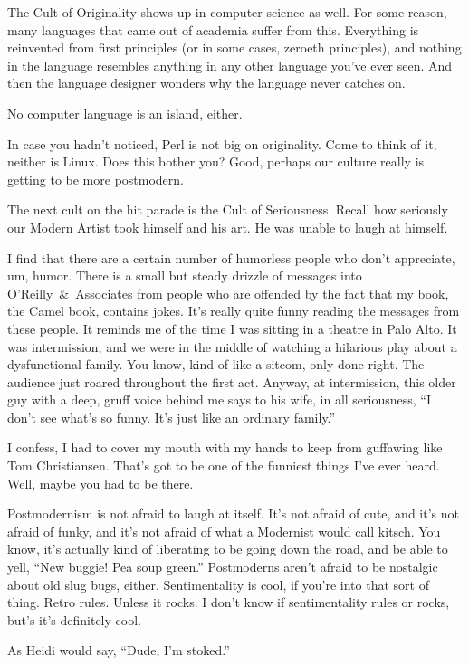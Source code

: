 \documentclass[10pt,letterpaper]{article}
\begin{document}
The Cult of Originality shows up in computer science as well. For some
reason, many languages that came out of academia suffer from this. Everything
is reinvented from first principles (or in some cases, zeroeth principles),
and nothing in the language resembles anything in any other language you've
ever seen. And then the language designer wonders why the language never
catches on.

No computer language is an island, either.

In case you hadn't noticed, Perl is not big on originality. Come to think of
it, neither is Linux. Does this bother you? Good, perhaps our culture really
is getting to be more postmodern.

The next cult on the hit parade is the Cult of Seriousness. Recall how
seriously our Modern Artist took himself and his art. He was unable to laugh
at himself.

I find that there are a certain number of humorless people who don't
appreciate, um, humor. There is a small but steady drizzle of messages into
O'Reilly~\&~Associates from people who are offended by the fact that my book,
the Camel book, contains jokes. It's really quite funny reading the messages
from these people. It reminds me of the time I was sitting in a theatre in
Palo Alto. It was intermission, and we were in the middle of watching a
hilarious play about a dysfunctional family. You know, kind of like a sitcom,
only done right. The audience just roared throughout the first act. Anyway,
at intermission, this older guy with a deep, gruff voice behind me says to
his wife, in all seriousness, ``I don't see what's so funny. It's just like
an ordinary family.''

I confess, I had to cover my mouth with my hands to keep from guffawing like
Tom Christiansen. That's got to be one of the funniest things I've ever
heard. Well, maybe you had to be there.

Postmodernism is not afraid to laugh at itself. It's not afraid of cute, and
it's not afraid of funky, and it's not afraid of what a Modernist would call
kitsch. You know, it's actually kind of liberating to be going down the road,
and be able to yell, ``New buggie! Pea soup green.'' Postmoderns aren't
afraid to be nostalgic about old slug bugs, either. Sentimentality is cool,
if you're into that sort of thing. Retro rules. Unless it rocks. I don't know
if sentimentality rules or rocks, but's it's definitely cool.

As Heidi would say, ``Dude, I'm stoked.''
\end{document}

